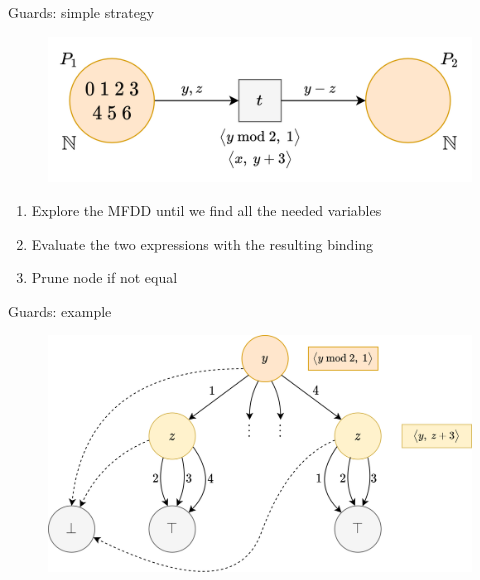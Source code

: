 \documentclass[10pt]{beamer}
\begin{document}
\begin{frame}[fragile]{Guards: simple strategy}
    \begin{figure}
        \centering
        \includegraphics[width=1.0\textwidth]{guards.png}
    \end{figure}
    \begin{enumerate}
        \setlength\itemsep{1.15em}
        \item Explore the MFDD until we find all the needed variables
        \item Evaluate the two expressions with the resulting binding
        \item Prune node if not equal
    \end{enumerate}
\end{frame}

\begin{frame}[fragile]{Guards: example}
    \begin{figure}
        \centering
        \includegraphics[width=1.0\textwidth]{guardsex.png}
    \end{figure}
\end{frame}
\end{document}
